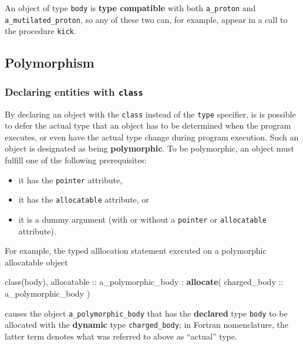 \documentclass[
  paper=a4,
  ,captions=tableheading
]{scrartcl}
\newenvironment{Shaded}{\begin{snugshade}}{\end{snugshade}}
\newcommand{\DataTypeTok}[1]{\textcolor[rgb]{0.13,0.29,0.53}{#1}}
\newcommand{\KeywordTok}[1]{\textcolor[rgb]{0.13,0.29,0.53}{\textbf{#1}}}
\newcommand{\NormalTok}[1]{#1}
\providecommand{\tightlist}{%
  \setlength{\itemsep}{0pt}\setlength{\parskip}{0pt}}
\begin{document}
An object of type \texttt{body} is \textbf{type compatible} with both
\texttt{a\_proton} and \texttt{a\_mutilated\_proton}, so any of these
two can, for example, appear in a call to the procedure \texttt{kick}.

\subsection{Polymorphism}\label{polymorphism}

\subsubsection{\texorpdfstring{Declaring entities with
\texttt{class}}{Declaring entities with class}}\label{declaring-entities-with-class}

By declaring an object with the \texttt{class} instead of the
\texttt{type} specifier, is is possible to defer the actual type that an
object has to be determined when the program executes, or even have the
actual type change during program execution. Such an object is
designated as being \textbf{polymorphic}. To be polymorphic, an object
must fulfill one of the following prerequisites:

\begin{itemize}
\tightlist
\item
  it has the \texttt{pointer} attribute,
\item
  it has the \texttt{allocatable} attribute, or
\item
  it is a dummy argument (with or without a \texttt{pointer} or
  \texttt{allocatable} attribute).
\end{itemize}

For example, the typed alllocation statement executed on a polymorphic
allocatable object

\begin{Shaded}
\begin{Highlighting}[]
\DataTypeTok{class(body)}\NormalTok{, }\DataTypeTok{allocatable} \DataTypeTok{::}\NormalTok{ a\_polymorphic\_body}
\NormalTok{:}
\KeywordTok{allocate}\NormalTok{( charged\_body }\DataTypeTok{::}\NormalTok{ a\_polymorphic\_body )}
\end{Highlighting}
\end{Shaded}

causes the object \texttt{a\_polymorphic\_body} that has the
\textbf{declared} type \texttt{body} to be allocated with the
\textbf{dynamic} type \texttt{charged\_body}; in Fortran nomenclature,
the latter term denotes what was referred to above as ``actual'' type.
\end{document}
